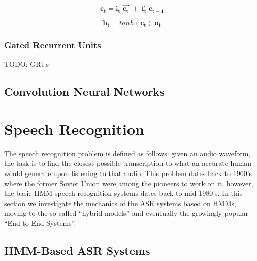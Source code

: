 



\begin{equation}
\label{eq:11}
\mathbf{c_t} = \mathbf{i_t } \; \mathbf{\vec{c_t}} \; + \;  \mathbf{f_t} \; \mathbf{c_{t-1}}
\end{equation}

\begin{equation}
\label{eq:12}
\mathbf{h_t} = tanh(\mathbf{c_t}) \; \mathbf{o_t}
\end{equation}




\subsubsection{Gated Recurrent Units}
\label{bg:subsub6}
TODO: \ac{GRUs}


\subsection{Convolution Neural Networks} 
\label{bg:sub3}



\section{Speech Recognition} \label{bg:s3}

The speech recognition problem is defined as follows: given an audio waveform, the task is to find the closest possible transcription to what an accurate human would generate upon listening to that audio. This problem dates back to 1960's where the former Soviet Union were among the pioneers to work on it, however, the basic \ac{HMM} speech recognition systems dates back to mid 1980's. In this section we investigate the mechanics of the \ac{ASR} systems based on \ac{HMM}s, moving to the so called \enquote{hybrid models} and eventually the growingly popular \enquote{End-to-End Systems}.

\subsection{HMM-Based \ac{ASR} Systems} 
\label{bg:sub4}

